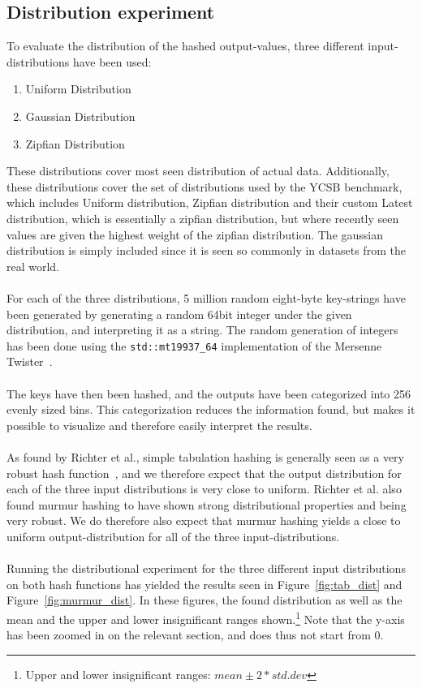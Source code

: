 \documentclass[11pt]{report} %
\begin{document}
\subsection{Distribution experiment}
\label{subsec:hash_func_dist}
To evaluate the distribution of the hashed output-values, three different input-distributions have been used:
\begin{enumerate}[noitemsep]
  \item Uniform Distribution
  \item Gaussian Distribution
  \item Zipfian Distribution
\end{enumerate}
\noindent
These distributions cover most seen distribution of actual data. Additionally, these distributions cover the set of distributions used by the YCSB benchmark, which includes Uniform distribution, Zipfian distribution and their custom Latest distribution, which is essentially a zipfian distribution, but where recently seen values are given the highest weight of the zipfian distribution. The gaussian distribution is simply included since it is seen so commonly in datasets from the real world.\\
\\
For each of the three distributions, 5 million random eight-byte key-strings have been generated by generating a random 64bit integer under the given distribution, and interpreting it as a string. The random generation of integers has been done using the \verb|std::mt19937_64| implementation of the Mersenne Twister~\cite{MT02}.\\
\\
The keys have then been hashed, and the outputs have been categorized into 256 evenly sized bins. This categorization reduces the information found, but makes it possible to visualize and therefore easily interpret the results.\\
\\
As found by Richter et al., simple tabulation hashing is generally seen as a very robust hash function~\cite{RAD15}, and we therefore expect that the output distribution for each of the three input distributions is very close to uniform. Richter et al. also found murmur hashing to have shown strong distributional properties and being very robust. We do therefore also expect that murmur hashing yields a close to uniform output-distribution for all of the three input-distributions. \\
\\
Running the distributional experiment for the three different input distributions on both hash functions has yielded the results seen in Figure~\ref{fig:tab_dist} and Figure~\ref{fig:murmur_dist}. In these figures, the found distribution as well as the mean and the upper and lower insignificant ranges shown.\footnote{Upper and lower insignificant ranges: $mean \pm 2*std.dev$} Note that the y-axis has been zoomed in on the relevant section, and does thus not start from 0.\\
\end{document}
